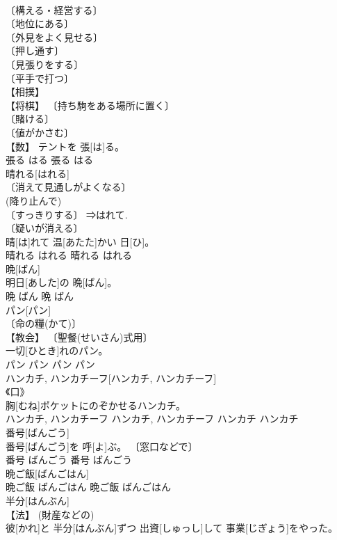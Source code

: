 \documentclass[8pt]{extreport}
\begin{document}
\begin{CJK}{UTF8}{min}
\\	〔構える・経営する〕 
\\	〔地位にある〕 
\\	〔外見をよく見せる〕 
\\	〔押し通す〕 
\\	〔見張りをする〕 
\\	〔平手で打つ〕 
\\	【相撲】 
\\	【将棋】 〔持ち駒をある場所に置く〕 
\\	〔賭ける〕 
\\	〔値がかさむ〕 
\\	【数】	テントを 張[は]る。	
\\	張る	はる	張る	はる	
\\	晴れる[はれる]	
\\	〔消えて見通しがよくなる〕 
\\	(降り止んで) 
\\	〔すっきりする〕 ⇒はれて. 
\\	〔疑いが消える〕 
\\	晴[は]れて 温[あたた]かい 日[ひ]。	
\\	晴れる	はれる	晴れる	はれる	
\\	晩[ばん]	
\\	[⇒よる１]	明日[あした]の 晩[ばん]。	
\\	晩	ばん	晩	ばん	
\\	パン[パン]	
\\	〔命の糧(かて)〕 
\\	【教会】 〔聖餐(せいさん)式用〕 
\\	一切[ひとき]れのパン。	
\\	パン	パン	パン	パン	
\\	ハンカチ, ハンカチーフ[ハンカチ, ハンカチーフ]	
\\	《口》 
\\	胸[むね]ポケットにのぞかせるハンカチ。	
\\	ハンカチ, ハンカチーフ	ハンカチ, ハンカチーフ	ハンカチ	ハンカチ	
\\	番号[ばんごう]	
\\	番号[ばんごう]を 呼[よ]ぶ。	〔窓口などで〕 
\\	番号	ばんごう	番号	ばんごう	
\\	晩ご飯[ばんごはん]	
\\	晩ご飯	ばんごはん	晩ご飯	ばんごはん	
\\	半分[はんぶん]	
\\	【法】 (財産などの) 
\\	彼[かれ]と 半分[はんぶん]ずつ 出資[しゅっし]して 事業[じぎょう]をやった。	

\end{CJK}
\end{document}
